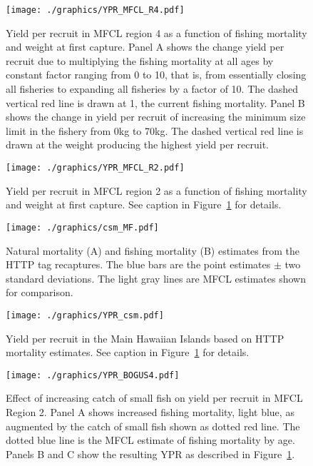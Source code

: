\documentclass[12pt,letterpaper,twoside]{article}
\begin{document}
\begin{figure}
\begin{center}
\texttt{[image: ./graphics/YPR\_MFCL\_R4.pdf]}
\caption{\label{fig:r4ypr}
Yield per recruit in MFCL region 4 as a function of fishing mortality
and weight at first capture.
Panel A shows the change yield per recruit due to multiplying
the fishing mortality at all ages by constant factor ranging from 0 to
10, that is, from essentially closing all fisheries to expanding all
fisheries by a factor of 10. 
The dashed vertical red line is drawn at 1, the current fishing mortality.
Panel B shows the change in yield per recruit of increasing
the minimum size limit in the fishery from 0kg to 70kg. 
The dashed vertical red line is drawn at the weight producing the
highest yield per recruit.
}
\end{center}
\end{figure}

\begin{figure}
\begin{center}
\texttt{[image: ./graphics/YPR\_MFCL\_R2.pdf]}
\caption{\label{fig:r2ypr}
Yield per recruit in MFCL region 2 as a function of fishing mortality
and weight at first capture. 
See caption in Figure~\ref{fig:r4ypr} for details.
}
\end{center}
\end{figure}

\begin{figure}
\begin{center}
\texttt{[image: ./graphics/csm\_MF.pdf]}
\caption{\label{fig:csmmf}
Natural mortality (A) and fishing mortality (B) estimates from the 
HTTP tag recaptures.
The blue bars are the point estimates $\pm$ two standard deviations.
The light gray lines are MFCL estimates shown for comparison.
}
\end{center}
\end{figure}

\begin{figure}
\begin{center}
\texttt{[image: ./graphics/YPR\_csm.pdf]}
\caption{\label{fig:yprcsm}
Yield per recruit in the Main Hawaiian Islands based on HTTP mortality
estimates. 
See caption in Figure~\ref{fig:r4ypr} for details.
}
\end{center}
\end{figure}

\begin{figure}
\begin{center}
\texttt{[image: ./graphics/YPR\_BOGUS4.pdf]}
\caption{\label{fig:yprbogus}
Effect of increasing catch of small fish on yield per recruit in MFCL
Region 2.
Panel A shows increased fishing mortality, light blue,
as augmented by the catch of
small fish shown as dotted red line. The dotted blue line is the MFCL
estimate of fishing mortality by age.
Panels B and C show the resulting YPR as described in
Figure~\ref{fig:r4ypr}.
}
\end{center}
\end{figure}
\end{document}
